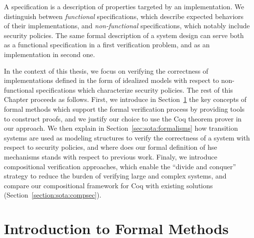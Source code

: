 %
A specification is a description of properties targeted by an implementation.
%
We distinguish between \emph{functional} specifications, which describe expected
behaviors of their implementations,
and \emph{non-functional} specifications, which notably include security
policies.
%
The same formal description of a system design can serve both as a functional
specification in a first verification problem, and as an implementation in
second one.
%

In the context of this thesis, we focus on verifying the correctness of
implementations defined in the form of idealized models with respect to
non-functional specifications which characterize security policies.
%
%
%
The rest of this Chapter proceeds as follows.
%
First, we introduce in Section~\ref{sec:sota:fm} the key concepts of formal
methods which support the formal verification process by providing tools to
construct proofs, and we justify our choice to use the Coq theorem prover in our
approach.
%
We then explain in Section~\ref{sec:sota:formalisms} how transition systems are
used as modeling structures to verify the correctness of a system with respect
to security policies, and where does our formal definition of \ac{hse}
mechanisms stands with respect to previous work.
%
Finaly, we introduce compositional verification approaches, which enable the
``divide and conquer'' strategy to reduce the burden of verifying large and
complex systems, and compare our compositional framework for Coq with existing
solutions (Section~\ref{section:sota:compsec}).

\section{Introduction to Formal Methods}
\label{sec:sota:fm}

